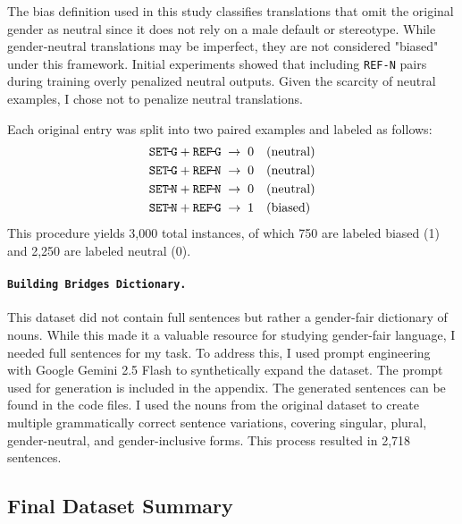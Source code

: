 \noindent
The bias definition used in this study classifies translations that omit the original gender as neutral since it does not rely on a male default or stereotype. While gender‑neutral translations may be imperfect, they are not considered "biased" under this framework. Initial experiments showed that including \texttt{REF-N} pairs during training overly penalized neutral outputs. Given the scarcity of neutral examples, I chose not to penalize neutral translations. 

Each original entry was split into two paired examples and labeled as follows:  
\[
\begin{aligned}
\texttt{SET\!-\!G} + \texttt{REF\!-\!G} &\;\rightarrow\; 0 \quad(\text{neutral})\\
\texttt{SET\!-\!G} + \texttt{REF\!-\!N} &\;\rightarrow\; 0 \quad(\text{neutral})\\
\texttt{SET\!-\!N} + \texttt{REF\!-\!N} &\;\rightarrow\; 0 \quad(\text{neutral})\\
\texttt{SET\!-\!N} + \texttt{REF\!-\!G} &\;\rightarrow\; 1 \quad(\text{biased})
\end{aligned}
\]  
This procedure yields 3,000 total instances, of which 750 are labeled biased (1) and 2,250 are labeled neutral (0).  


\paragraph{\texttt{Building Bridges Dictionary.}} This dataset did not contain full sentences but rather a gender-fair dictionary of nouns. While this made it a valuable resource for studying gender-fair language, I needed full sentences for my task. To address this, I used prompt engineering with Google Gemini 2.5 Flash to synthetically expand the dataset. The prompt used for generation is included in the appendix. The generated sentences can be found in the code files. I used the nouns from the original dataset to create multiple grammatically correct sentence variations, covering singular, plural, gender-neutral, and gender-inclusive forms. This process resulted in 2,718 sentences.

\subsection{Final Dataset Summary}

